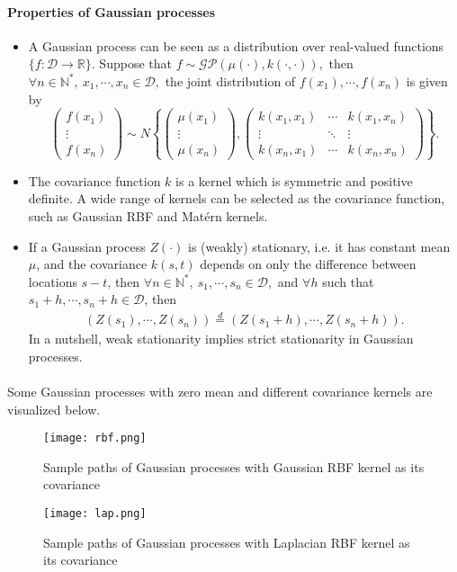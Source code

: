 \documentclass{article}
\begin{document}
\paragraph{Properties of Gaussian processes}
\begin{itemize}
\item A Gaussian process can be seen as a distribution over real-valued functions $\lbrace f:\mathcal{D}\to\mathbb{R}\rbrace.$ Suppose that $f\sim\mathcal{GP}\left(\mu(\cdot),k(\cdot,\cdot)\right),$ then $\forall n\in\mathbb{N}^*,\ x_1,\cdots,x_n\in\mathcal{D},$ the joint distribution of $f(x_1),\cdots,f(x_n)$ is given by
\begin{equation*}
	\begin{pmatrix} f(x_1) \\ \vdots\\ f(x_n) \end{pmatrix} \sim N\left\lbrace
	\begin{pmatrix} \mu(x_1) \\ \vdots\\ \mu(x_n) \end{pmatrix},
	\begin{pmatrix} k(x_1,x_1) & \cdots & k(x_1,x_n) \\ \vdots & \ddots & \vdots\\ k(x_n, x_1) & \cdots & k(x_n,x_n) \end{pmatrix}\right\rbrace.\tag{3.2}
\end{equation*}
\item The covariance function $k$ is a kernel which is symmetric and positive definite. A wide range of kernels can be selected as the covariance function, such as Gaussian RBF and Matérn kernels.
\item If a Gaussian process $Z(\cdot)$ is (weakly) stationary, i.e. it has constant mean $\mu$, and the covariance $k(s,t)$ depends on only the difference between locations $s-t$, then $\forall n\in\mathbb{N}^*,\ s_1,\cdots,s_n\in\mathcal{D},$ and $\forall h$ such that $s_1+h,\cdots,s_n+h\in\mathcal{D}$, then
\begin{align*}
	\left(Z(s_1),\cdots,Z(s_n)\right) \overset{d}{=} \left(Z(s_1 + h),\cdots,Z(s_n + h)\right).\tag{3.3}
\end{align*}
In a nutshell, weak stationarity implies strict stationarity in Gaussian processes.
\end{itemize}

\paragraph{} Some Gaussian processes with zero mean and different covariance kernels are visualized below.
\begin{figure}[H]
	\centering
	\texttt{[image: rbf.png]}
	\caption{Sample paths of Gaussian processes with Gaussian RBF kernel as its covariance}
\end{figure}
\begin{figure}[H]
	\centering
	\texttt{[image: lap.png]}
	\caption{Sample paths of Gaussian processes with Laplacian RBF kernel as its covariance}
\end{figure}
\end{document}
